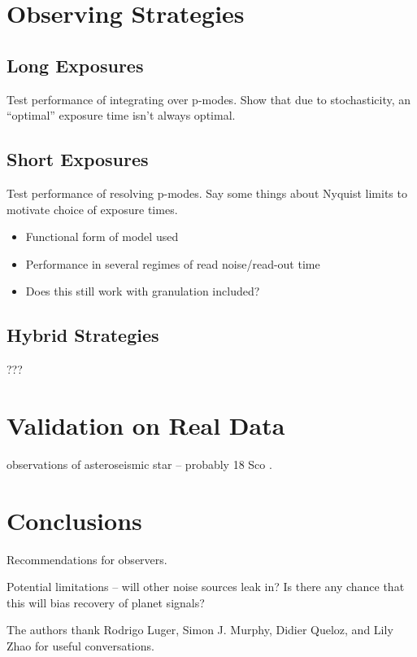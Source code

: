 \documentclass[modern]{aastex62}
\begin{document}
\section{Observing Strategies}

\subsection{Long Exposures}

Test performance of integrating over p-modes. Show that due to stochasticity, an ``optimal'' exposure time isn't always optimal.

\subsection{Short Exposures}

Test performance of resolving p-modes. Say some things about Nyquist limits to motivate choice of exposure times.

\begin{itemize}
\item Functional form of model used
\item Performance in several regimes of read noise/read-out time
\item Does this still work with granulation included?
\end{itemize}

\subsection{Hybrid Strategies}

???

\section{Validation on Real Data}

\HARPS observations of asteroseismic star -- probably 18 Sco \citep{Bazot2012}.

\section{Conclusions}

Recommendations for observers.

Potential limitations -- will other noise sources leak in? Is there any chance that this will bias recovery of planet signals?


\acknowledgements
The authors thank Rodrigo Luger, Simon J. Murphy, Didier Queloz, and Lily Zhao for useful conversations.



\clearpage


\end{document}

